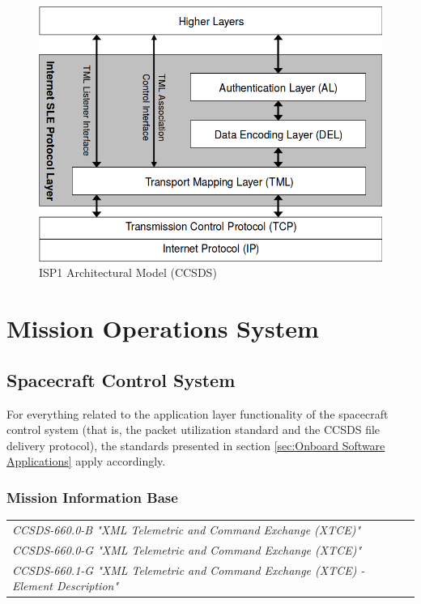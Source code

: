 \begin{figure}[h]
\centering\includegraphics[scale=0.4]{fig/isp1_architectural_model}
\caption{ISP1 Architectural Model (CCSDS)}
\label{fig:ISP1 Architectural Model}
\end{figure}

\section{Mission Operations System}

\subsection{Spacecraft Control System}

For everything related to the application layer functionality of the spacecraft control system (that is, the packet utilization standard and the CCSDS file delivery protocol), the standards presented in section \ref{sec:Onboard Software Applications} apply accordingly.

\subsubsection{Mission Information Base}

\begin{tabular}{l}
\textit{CCSDS-660.0-B "XML Telemetric and Command Exchange (XTCE)" \cite{CCSDS-660.0-B}} \\
\textit{CCSDS-660.0-G "XML Telemetric and Command Exchange (XTCE)" \cite{CCSDS-660.0-G}} \\
\textit{CCSDS-660.1-G "XML Telemetric and Command Exchange (XTCE) - Element Description" \cite{CCSDS-660.1-G}} \\
\end{tabular}

